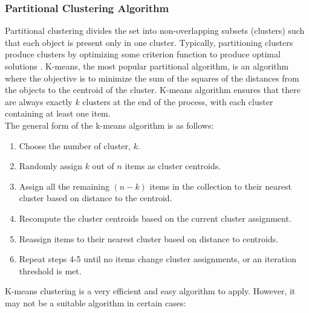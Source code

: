 \subsubsection{Partitional Clustering Algorithm}

Partitional clustering divides the set into non-overlapping subsets (clusters) such that each object is present only in one cluster. Typically, partitioning clusters produce clusters by optimizing some criterion function to produce optimal solutions \cite{Hartigan1975}. K-means, the most popular partitional algorithm, is an algorithm  where the objective is to minimize the sum of the squares of the distances from the objects to the centroid of the cluster. K-means algorithm ensures that there are always exactly $k$ clusters at the end of the process, with each cluster containing at least one item. \\

The general form of the k-means algorithm is as follows:

\begin{enumerate}
\item Choose the number of cluster, $k$.
\item Randomly assign $k$ out of $n$ items as cluster centroids.
\item Assign all the remaining $(n-k)$ items in the collection to their nearest cluster based on distance to the centroid.
\item Recompute the cluster centroids based on the current cluster assignment. 
\item Reassign items to their nearest cluster based on distance to centroids.  
\item Repeat steps 4-5 until no items change cluster assignments, or an iteration threshold is met. 
 \end{enumerate}

K-means clustering is a very efficient and easy algorithm to apply. However, it may not be a suitable algorithm in certain cases:

